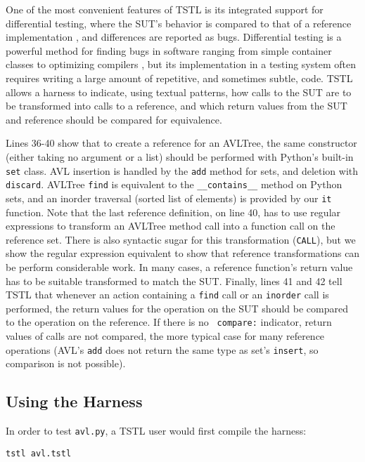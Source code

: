 \documentclass{sig-alternate}
\begin{document}
One of the most convenient features of TSTL is its integrated support
for differential testing, where the SUT's behavior is compared to that
of a reference implementation \cite{Differential,ICSEDiff}, and
differences are reported as bugs.  Differential testing is a powerful
method for finding bugs in software ranging from simple container
classes to optimizing compilers \cite{CSmith}, but its implementation
in a testing system often requires writing a large amount of
repetitive, and sometimes subtle, code.  TSTL allows a harness to
indicate, using textual patterns, how calls to the SUT are to be
transformed into calls to a reference, and which return values from
the SUT and reference should be compared for equivalence.

Lines 36-40 show that to create a reference for an AVLTree, the same
constructor (either taking no argument or a list) should be performed
with Python's built-in {\tt set} class.  AVL insertion is handled by
the {\tt add} method for sets, and deletion with {\tt discard}.
AVLTree  {\tt find} is equivalent to the {\tt \_\_contains\_\_} method
on Python sets, and an inorder traversal (sorted list of elements) is
provided by our {\tt it} function.  Note that the last reference
definition, on line 40, has to use regular expressions to transform an
AVLTree method call into a function call on the reference set.  There
is also syntactic sugar for this transformation ({\tt CALL}), but we
show the regular expression equivalent to show that reference
transformations can be perform considerable work.  In many cases, a
reference function's return value has to be suitable transformed to
match the SUT.  Finally, lines 41 and 42 tell TSTL that whenever an
action containing a {\tt find} call or an {\tt inorder} call is
performed, the return values for the operation on the SUT should be
compared to the operation on the reference.  If there is no {\tt
  compare:} indicator, return values of calls are not compared, the
more typical case for many reference operations (AVL's
{\tt add} does not return the same type as set's {\tt insert}, so
comparison is not possible).

\subsection{Using the Harness}

In order to test {\tt avl.py},  a TSTL user would first compile the
harness:

\begin{verbatim}
tstl avl.tstl
\end{verbatim}
\end{document}
